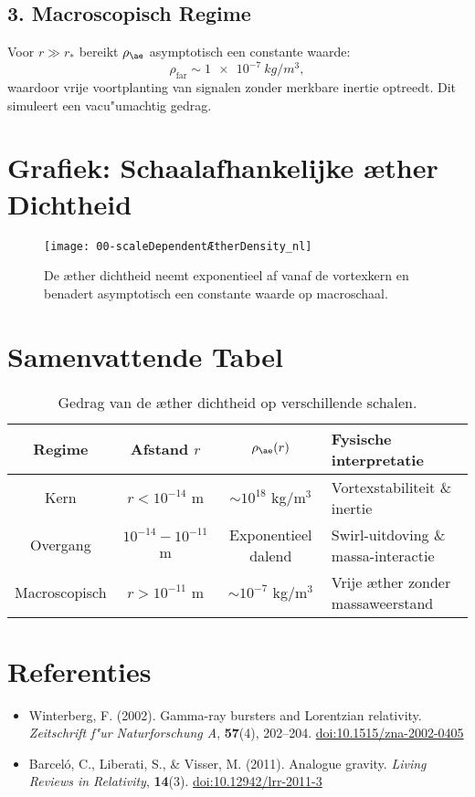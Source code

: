 \documentclass[a4paper,12pt]{article}
\begin{document}
\subsection*{3. Macroscopisch Regime}

Voor \( r \gg r_* \) bereikt \( \rho_{\ae} \) asymptotisch een constante waarde:
\begin{equation}
\rho_{\text{far}} \sim \SI{1e-7}{kg/m^3},
\end{equation}
waardoor vrije voortplanting van signalen zonder merkbare inertie optreedt. Dit simuleert een vacu"umachtig gedrag.

\section*{Grafiek: Schaalafhankelijke \ae ther Dichtheid}

\begin{figure}[htbp]
\centering
\texttt{[image: 00-scaleDependentÆtherDensity\_nl]}
  \caption{De \ae ther dichtheid neemt exponentieel af vanaf de vortexkern en benadert asymptotisch een constante waarde op macroschaal.}
\label{fig:vortexfields}
\end{figure}


\section*{Samenvattende Tabel}

\begin{table}[h!]
\centering
\begin{tabular}{|c|c|c|l|}
\hline
Regime & Afstand $r$ & $\rho_{\ae}(r)$ & Fysische interpretatie \\
\hline
Kern & $r < 10^{-14}$ m & $\sim 10^{18}$ kg/m$^3$ & Vortexstabiliteit \& inertie \\
Overgang & $10^{-14} - 10^{-11}$ m & Exponentieel dalend & Swirl-uitdoving \& massa-interactie \\
Macroscopisch & $r > 10^{-11}$ m & $\sim 10^{-7}$ kg/m$^3$ & Vrije \ae ther zonder massaweerstand \\
\hline
\end{tabular}
\caption{Gedrag van de \ae ther dichtheid op verschillende schalen.}
\end{table}

\section*{Referenties}

\begin{itemize}
  \item Winterberg, F. (2002). Gamma-ray bursters and Lorentzian relativity. \emph{Zeitschrift f"ur Naturforschung A}, \textbf{57}(4), 202--204. \href{https://doi.org/10.1515/zna-2002-0405}{doi:10.1515/zna-2002-0405}
  \item Barcel\'o, C., Liberati, S., \& Visser, M. (2011). Analogue gravity. \emph{Living Reviews in Relativity}, \textbf{14}(3). \href{https://doi.org/10.12942/lrr-2011-3}{doi:10.12942/lrr-2011-3}
\end{itemize}
\end{document}
